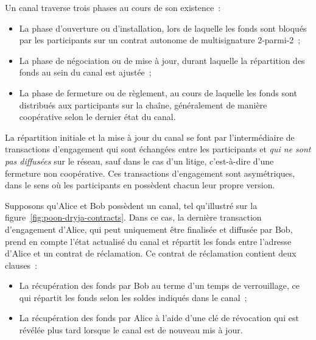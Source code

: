 Un canal traverse trois phases au cours de son existence~:

\begin{itemize}
\item La phase d'ouverture ou d'installation, lors de laquelle les fonds sont bloqués par les participants sur un contrat autonome de multisignature 2-parmi-2~;
\item La phase de négociation ou de mise à jour, durant laquelle la répartition des fonds au sein du canal est ajustée~;
\item La phase de fermeture ou de règlement, au cours de laquelle les fonds sont distribués aux participants sur la chaîne, généralement de manière coopérative selon le dernier état du canal.
\end{itemize}

%
%
%

La répartition initiale et la mise à jour du canal se font par l'intermédiaire de transactions d'engagement qui sont échangées entre les participants et \emph{qui ne sont pas diffusées} sur le réseau, sauf dans le cas d'un litige, c'est-à-dire d'une fermeture non coopérative. Ces transactions d'engagement sont asymétriques, dans le sens où les participants en possèdent chacun leur propre version.

Supposons qu'Alice et Bob possèdent un canal, tel qu'illustré sur la figure~\ref{fig:poon-dryja-contracts}. Dans ce cas, la dernière transaction d'engagement d'Alice, qui peut uniquement être finalisée et diffusée par Bob, prend en compte l'état actualisé du canal et répartit les fonds entre l'adresse d'Alice et un contrat de réclamation. Ce contrat de réclamation contient deux clauses~:

\begin{itemize}
\item La récupération des fonds par Bob au terme d'un temps de verrouillage, ce qui répartit les fonds selon les soldes indiqués dans le canal~;
\item La récupération des fonds par Alice à l'aide d'une clé de révocation qui est révélée plus tard lorsque le canal est de nouveau mis à jour.
\end{itemize}


